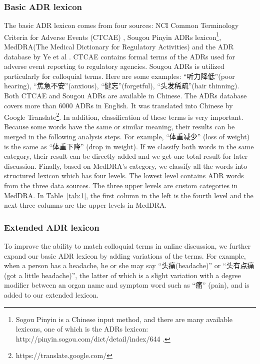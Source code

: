 \subsubsection{Basic ADR lexicon}
\label{subsubsec:2.1.2} 
The basic ADR lexicon comes from four sources: NCI Common Terminology Criteria for Adverse Events (CTCAE) \citep{trotti2003ctcae}, Sougou Pinyin ADRs lexicon\footnote{Sogou Pinyin is a Chinese input method, and there are many available lexicons, one of which is the 
ADRs lexicon: http://pinyin.sogou.com/dict/detail/index/644 .}, 
MedDRA(The Medical Dictionary for Regulatory Activities) \citep{brown1999the} and 
the ADR database by Ye et al \citep{ye2014construction}. CTCAE contains formal terms of 
the ADRs used for adverse event reporting to regulatory agencies. Sougou ADRs is utilized particularly for colloquial terms. Here are some examples: “听力降低”(poor hearing), “焦急不安”(anxious), “健忘”(forgetful), “头发稀疏”(hair thinning). Both CTCAE and Sougou ADRs are available in Chinese. The ADRs database covers more than 6000 ADRs in English. It was translated into Chinese by Google Translate\footnote{https://translate.google.com/}. In addition, classification of these terms is very important. Because some words have the same or similar meaning, their results can be merged in the following analysis steps. For example, “体重减少” (loss of weight) is the same as “体重下降” (drop in weight). If we classify both words in the same category, their result can be directly added and we get one total result for later discussion. Finally, based on MedDRA’s category, we classify all the words into structured lexicon which has four levels. The lowest level contains ADR words from the three data sources. The three upper levels are custom categories in MedDRA. In Table~\ref{tab:1}, the first column in the left is the fourth level and the next three columns are the upper levels in MedDRA.

\subsubsection{Extended ADR lexicon}
\label{subsubsec:2.1.3} 
To improve the ability to match colloquial terms in online discussion, we further expand our basic ADR lexicon by adding variations of the terms. For example, when a person has a headache, he or she may say “头痛(headache)” or “头有点痛(got a little headache)”, the latter of which is a slight variation with a degree modifier between an organ name and symptom word such as “痛” (pain), and is added to our extended lexicon.

